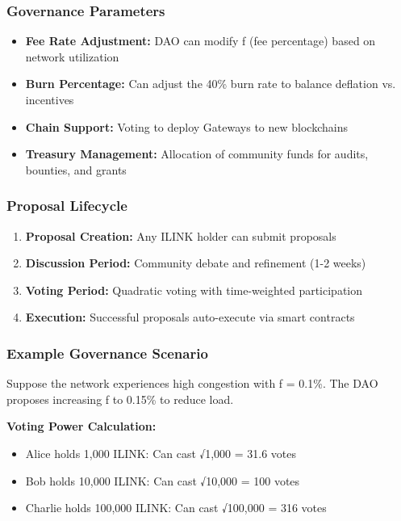 \documentclass[11pt,a4paper]{article}
\begin{document}
\subsubsection{Governance Parameters}
\begin{itemize}
    \item \textbf{Fee Rate Adjustment:} DAO can modify f (fee percentage) based on network utilization
    \item \textbf{Burn Percentage:} Can adjust the 40\% burn rate to balance deflation vs. incentives
    \item \textbf{Chain Support:} Voting to deploy Gateways to new blockchains
    \item \textbf{Treasury Management:} Allocation of community funds for audits, bounties, and grants
\end{itemize}

\subsubsection{Proposal Lifecycle}
\begin{enumerate}
    \item \textbf{Proposal Creation:} Any ILINK holder can submit proposals
    \item \textbf{Discussion Period:} Community debate and refinement (1-2 weeks)
    \item \textbf{Voting Period:} Quadratic voting with time-weighted participation
    \item \textbf{Execution:} Successful proposals auto-execute via smart contracts
\end{enumerate}

\subsubsection{Example Governance Scenario}
Suppose the network experiences high congestion with f = 0.1\%. The DAO proposes increasing f to 0.15\% to reduce load.

\textbf{Voting Power Calculation:}
\begin{itemize}
    \item Alice holds 1,000 ILINK: Can cast √1,000 = 31.6 votes
    \item Bob holds 10,000 ILINK: Can cast √10,000 = 100 votes  
    \item Charlie holds 100,000 ILINK: Can cast √100,000 = 316 votes
\end{itemize}
\end{document}
